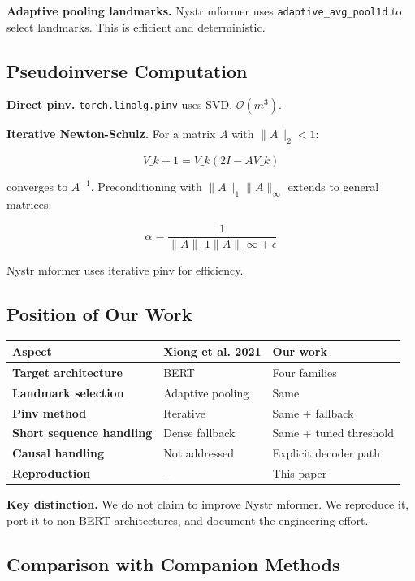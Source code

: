 \textbf{Adaptive pooling landmarks.} Nystr mformer uses \texttt{adaptive\_avg\_pool1d} 
to select landmarks. This is efficient and deterministic.

\subsection{Pseudoinverse Computation}

\textbf{Direct pinv.} \texttt{torch.linalg.pinv} uses SVD. $\mathcal{O}(m^3)$.

\textbf{Iterative Newton-Schulz.} For a matrix $A$ with $\|A\|_2 < 1$:

\[
V\_{k+1} = V\_k (2I - A V\_k)
\tag{2.2}
\]

converges to $A^{-1}$. Preconditioning with $\|A\|_1 \|A\|_\infty$ 
extends to general matrices:

\[
\alpha = \frac{1}{\|A\|\_1 \|A\|\_\infty + \epsilon}
\tag{2.3}
\]

Nystr mformer uses iterative pinv for efficiency.

\subsection{Position of Our Work}

\begin{table}[H]
\centering
\small
\begin{tabular}{lll}
\toprule
\textbf{Aspect} & \textbf{Xiong et al. 2021} & \textbf{Our work} \\
\midrule
\textbf{Target architecture} & BERT & Four families \\
\textbf{Landmark selection} & Adaptive pooling & Same \\
\textbf{Pinv method} & Iterative & Same + fallback \\
\textbf{Short sequence handling} & Dense fallback & Same + tuned threshold \\
\textbf{Causal handling} & Not addressed & Explicit decoder path \\
\textbf{Reproduction} & -- & This paper \\
\bottomrule
\end{tabular}
\end{table}

\textbf{Key distinction.} We do not claim to improve Nystr mformer. We reproduce 
it, port it to non-BERT architectures, and document the engineering effort.

\subsection{Comparison with Companion Methods}

